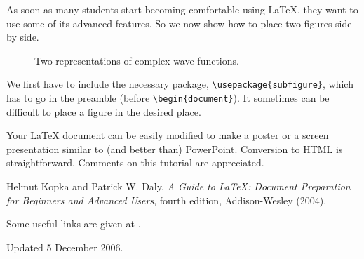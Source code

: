 \documentclass[12pt]{article}
\begin{document}
As soon as many students start becoming comfortable using \LaTeX, they want
to use some of its advanced features. So we now show how to place two
figures side by side.

\begin{figure}[h!]
\begin{center}
\caption{\label{fig:qm/complexfunctions} Two representations of complex
wave functions.}
\end{center}
\end{figure}

We first have to include the necessary package,
\verb+\usepackage{subfigure}+, which has to go in the preamble (before
\verb+\begin{document}+). It sometimes can be difficult to place a figure in
the desired place.

Your LaTeX document can be easily modified to make a poster or a screen
presentation similar to (and better than) PowerPoint. Conversion to HTML is
straightforward. Comments on this tutorial are appreciated.

\begin{thebibliography}{5}

Helmut Kopka and Patrick W. Daly, \textsl{A Guide to
\LaTeX: Document Preparation for Beginners and Advanced Users},
fourth edition, Addison-Wesley (2004).

Some useful links are
given at \url{}.

\end{thebibliography}

{\small \noindent Updated 5 December 2006.}
\end{document}
